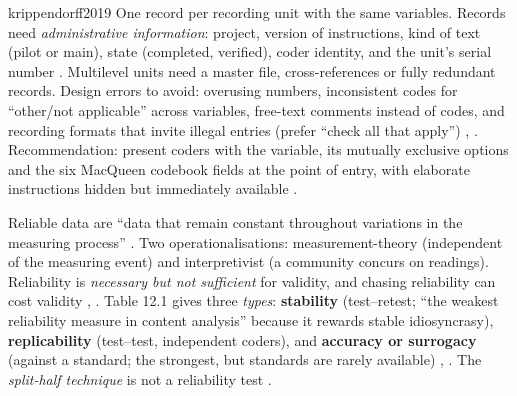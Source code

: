 \begin{papercard}{krippendorff2019}
 One record per recording unit with the same variables. Records need \emph{administrative information}: project, version of instructions, kind of text (pilot or main), state (completed, verified), coder identity, and the unit's serial number . Multilevel units need a master file, cross-references or fully redundant records. Design errors to avoid: overusing numbers, inconsistent codes for ``other/not applicable'' across variables, free-text comments instead of codes, and recording formats that invite illegal entries (prefer ``check all that apply'') , . Recommendation: present coders with the variable, its mutually exclusive options and the six MacQueen codebook fields at the point of entry, with elaborate instructions hidden but immediately available .

 Reliable data are ``data that remain constant throughout variations in the measuring process'' . Two operationalisations: measurement-theory (independent of the measuring event) and interpretivist (a community concurs on readings). Reliability is \emph{necessary but not sufficient} for validity, and chasing reliability can cost validity , . Table 12.1 gives three \emph{types}: \textbf{stability} (test--retest; ``the weakest reliability measure in content analysis'' because it rewards stable idiosyncrasy), \textbf{replicability} (test--test, independent coders), and \textbf{accuracy or surrogacy} (against a standard; the strongest, but standards are rarely available) , . The \emph{split-half technique} is not a reliability test .


\end{papercard}
